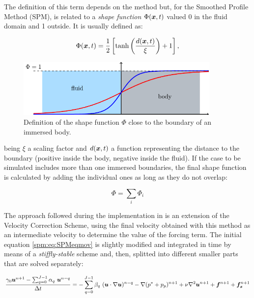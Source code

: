 The definition of this term depends on the method but, for the Smoothed Profile Method (SPM), is related to a \emph{shape function} $\Phi(\boldsymbol{x}, t)$ valued 0 in the fluid domain and 1 outside. It is usually defined as:

\begin{equation}
    \Phi(\boldsymbol{x}, t) = \frac{1}{2}\left[\tanh\left(\frac{d(\boldsymbol{x}, t)}{\xi}\right)+1\right],
\end{equation}

\begin{figure}[htb]
    \centering
    \includegraphics[width=10cm]{img/concentration.pdf}
    \caption{Definition of the shape function $\Phi$ close to the boundary of an immersed body.}
    \label{spm:fig:shapefunc}
\end{figure}

being $\xi$ a scaling factor \cite{WangSPM} and $d(\boldsymbol{x}, t)$ a function representing the distance to the boundary (positive inside the body, negative inside the fluid). If the case to be simulated includes more than one immersed boundaries, the final shape function is calculated by adding the individual ones as long as they do not overlap:

\begin{equation}
    \Phi = \sum_i \Phi_i
\end{equation}

The approach followed during the implementation in \nek is an extension of the Velocity Correction Scheme, using the final velocity obtained with this method as an intermediate velocity to determine the value of the forcing term. The initial equation \eqref{spm:eq:SPMeqmov} is slightly modified and integrated in time by means of a \emph{stiffly-stable} scheme and, then, splitted into different smaller parts that are solved separately:

\begin{equation}
     \frac{\gamma_0\boldsymbol{u}^{n+1}-\sum_{q=0}^{J-1}\alpha_q~\boldsymbol{u}^{n-q}}{\Delta t} = -\sum_{q=0}^{J-1}\beta_q~(\boldsymbol{u}\cdot\nabla\boldsymbol{u})^{n-q} -\nabla (p^*+p_p)^{n+1} + \nu\nabla^2\boldsymbol{u}^{n+1} + \boldsymbol{f}^{n+1} + \boldsymbol{f_s}^{n+1}
\end{equation}

